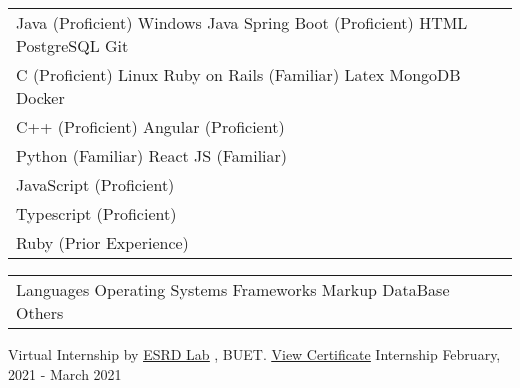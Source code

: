 \documentclass[]{awesome-cv}
\begin{document}
\begin{cventries}
	\cventry
	{\def\arraystretch{1.15}{\begin{tabular}{ l l }
				Java (Proficient) \hspace{1.2cm} Windows \hspace{1.6cm}  Java Spring Boot (Proficient) \hspace{1cm} HTML \hspace{1.2cm} PostgreSQL \hspace{1.4cm} Git  & {\skill{ }} \\
				C (Proficient) \hspace{1.6cm} Linux \hspace{2.4cm} Ruby on Rails (Familiar)  \hspace{1.3cm} Latex \hspace{1.4cm} MongoDB \hspace{1.4cm} Docker & {\skill{ }} \\
				C++ (Proficient) \hspace{4.7cm} Angular (Proficient) \hspace{1.4cm}   & {\skill{ }} \\
				Python (Familiar) \hspace{4.7cm} React JS (Familiar)  & {\skill{ }} \\
				JavaScript (Proficient) & {\skill{ }} \\ Typescript (Proficient)  & {\skill{ }} \\
				Ruby (Prior Experience)  & {\skill{ }} \\
	\end{tabular}}}
	{\def\arraystretch{1.15}{\begin{tabular}{ l l }
		Languages \hspace{1cm} Operating Systems \hspace{1.2cm} Frameworks \hspace{1.5cm} Markup \hspace{1cm} DataBase \hspace{1cm} Others  & {\skill{ }} \\
		\end{tabular}}}
	{}
	{}
	{}
	
\end{cventries}

\vspace{-7mm}


\begin{cventries}
	\cventry
	{Virtual Internship by \href{http://vinternship.org/}{\underline{ESRD Lab}} , BUET.  \href{https://drive.google.com/drive/u/0/folders/1sx3UMH5gBBTkda5ivJqcNqGb4bhuACwu}{\underline{View Certificate}}}
	{Internship}
	{}
	{February, 2021 - March 2021}
	{}
\end{cventries}
\end{document}
